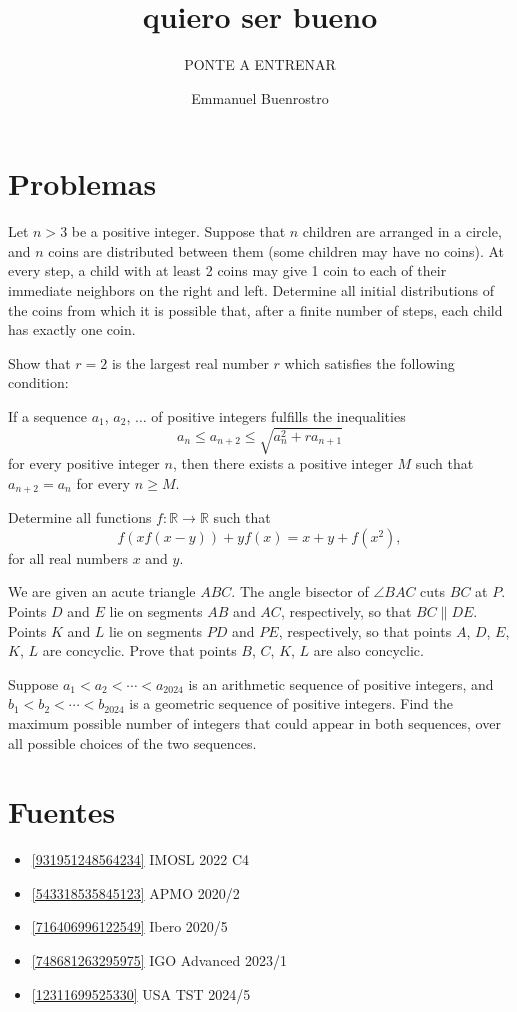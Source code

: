 \documentclass[11pt]{scrartcl}
\title{quiero ser bueno }
\subtitle{PONTE A ENTRENAR}
\author{Emmanuel Buenrostro}
\begin{document}
\maketitle

\section{Problemas}
\begin{problem}
\label{931951248564234}
Let $n > 3$ be a positive integer. Suppose that $n$ children are arranged in a circle, and $n$ coins are distributed between them (some children may have no coins). At every step, a child with at least 2 coins may give 1 coin to each of their immediate neighbors on the right and left. Determine all initial distributions of the coins from which it is possible that, after a finite number of steps, each child has exactly one coin.
\end{problem}
\begin{problem}
\label{543318535845123}
Show that $r = 2$ is the largest real number $r$ which satisfies the following condition:

If a sequence $a_1$, $a_2$, $\ldots$ of positive integers fulfills the inequalities
\[a_n \leq a_{n+2} \leq\sqrt{a_n^2+ra_{n+1}}\]for every positive integer $n$, then there exists a positive integer $M$ such that $a_{n+2} = a_n$ for every $n \geq M$.
\end{problem}
\begin{problem}
\label{716406996122549}
Determine all functions $f: \mathbb{R} \rightarrow \mathbb{R}$ such that$$f(xf(x-y))+yf(x)=x+y+f(x^2),$$for all real numbers $x$ and $y.$
\end{problem}
\begin{problem}
\label{748681263295975}
We are given an acute triangle $ABC$. The angle bisector of $\angle BAC$ cuts $BC$ at $P$. Points $D$ and $E$ lie on segments $AB$ and $AC$, respectively, so that $BC \parallel  DE$. Points $K$ and $L$ lie on segments $PD$ and $PE$, respectively, so that points $A$, $D$, $E$, $K$, $L$ are concyclic. Prove that points $B$, $C$, $K$, $L$ are also concyclic.
\end{problem}
\begin{problem}
\label{12311699525330}
	Suppose $a_{1} < a_{2}< \cdots < a_{2024}$ is an arithmetic sequence of positive integers, and $b_{1} <b_{2} < \cdots <b_{2024}$ is a geometric sequence of positive integers. Find the maximum possible number of integers that could appear in both sequences, over all possible choices of the two sequences.
\end{problem}
\section{Fuentes}
\begin{itemize}
\item \ref{931951248564234} IMOSL 2022 C4
\item \ref{543318535845123} APMO 2020/2
\item \ref{716406996122549} Ibero 2020/5
\item \ref{748681263295975} IGO Advanced 2023/1
\item \ref{12311699525330} USA TST 2024/5
\end{itemize}
\end{document}
